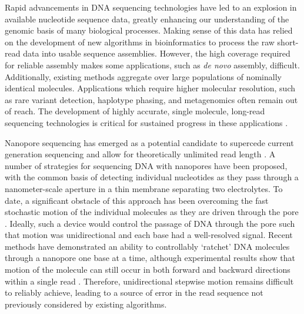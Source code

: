 \documentclass{biophys_letter}
\begin{document}
\begin{multicols}{2}


Rapid advancements in DNA sequencing technologies have led to an explosion in available nucleotide sequence data, greatly enhancing our understanding of the genomic basis of many biological processes.
Making sense of this data has relied on the development of new algorithms in bioinformatics to process the raw short-read data into usable sequence assemblies.
However, the high coverage required for reliable assembly makes some applications, such as \emph{de novo} assembly, difficult.
Additionally, existing methods aggregate over large populations of nominally identical molecules.
Applications which require higher molecular resolution, such as rare variant detection, haplotype phasing, and metagenomics often remain out of reach.
The development of highly accurate, single molecule, long-read sequencing technologies is critical for sustained progress in these applications \cite{Mak:2012}.

Nanopore sequencing has emerged as a potential candidate to supercede current generation sequencing and allow for theoretically unlimited read length \cite{Branton:2008}.
A number of strategies for sequencing DNA with nanopores have been proposed, with the common basis of detecting individual nucleotides as they pass through a nanometer-scale aperture in a thin membrane separating two electrolytes.
To date, a significant obstacle of this approach has been overcoming the fast stochastic motion of the individual molecules as they are driven through the pore \cite{Venkatesan:2011, Lu:2011}.
Ideally, such a device would control the passage of DNA through the pore such that motion was unidirectional and each base had a well-resolved signal.
Recent methods have demonstrated an ability to controllably `ratchet' DNA molecules through a nanopore one base at a time, although experimental results show that motion of the molecule can still occur in both forward and backward directions within a single read \cite{Luan:2011, Olasagasti:2010, Cherf:2012}.
Therefore, unidirectional stepwise motion remains difficult to reliably achieve, leading to a source of error in the read sequence not previously considered by existing algorithms.


\end{multicols}
\end{document}
